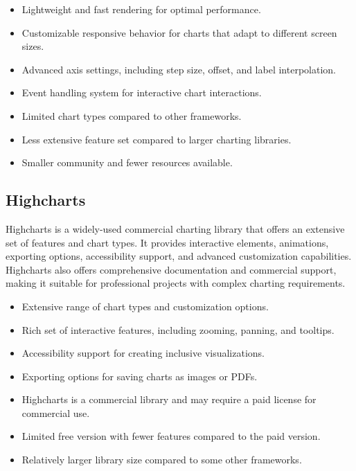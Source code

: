 \documentclass[a4paper, 11pt]{article}
\begin{document}
{\selectfont\large\mdseries\color{MSBlue}{ Main features:}}
\begin{itemize}[noitemsep,nolistsep]
  \item Lightweight and fast rendering for optimal performance.
  \item Customizable responsive behavior for charts that adapt to different screen sizes.
  \item Advanced axis settings, including step size, offset, and label interpolation.
  \item Event handling system for interactive chart interactions.
\end{itemize}\par

\medbreak
{\selectfont\large\mdseries\color{MSBlue}{ Main cons:}}
\begin{itemize}[noitemsep,nolistsep]
  \item Limited chart types compared to other frameworks.
  \item Less extensive feature set compared to larger charting libraries.
  \item Smaller community and fewer resources available.
\end{itemize}

\subsection{Highcharts}
Highcharts is a widely-used commercial charting library that offers an extensive set of features and chart types. It provides interactive elements, animations, exporting options, accessibility support, and advanced customization capabilities. Highcharts also offers comprehensive documentation and commercial support, making it suitable for professional projects with complex charting requirements.\par
\medbreak


{\selectfont\large\mdseries\color{MSBlue}{ Main features:}}
\begin{itemize}[noitemsep,nolistsep]
  \item Extensive range of chart types and customization options.
  \item Rich set of interactive features, including zooming, panning, and tooltips.
  \item Accessibility support for creating inclusive visualizations.
  \item Exporting options for saving charts as images or PDFs.
\end{itemize}\par

\medbreak
{\selectfont\large\mdseries\color{MSBlue}{ Main cons:}}
\begin{itemize}[noitemsep,nolistsep]
  \item Highcharts is a commercial library and may require a paid license for commercial use.
  \item Limited free version with fewer features compared to the paid version.
  \item Relatively larger library size compared to some other frameworks.
\end{itemize}
\end{document}
